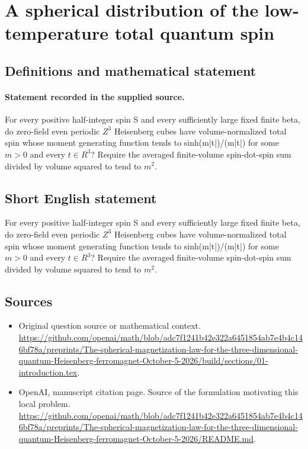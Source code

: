 \documentclass[11pt]{article}
\begin{document}
\section*{A spherical distribution of the low-temperature total quantum spin}\label{statement}
\subsection{Definitions and mathematical statement}
\paragraph{Statement recorded in the supplied source.}
For every positive half-integer spin S and every sufficiently large fixed finite beta, do zero-field even periodic $Z^3$ Heisenberg cubes have volume-normalized total spin whose moment generating function tends to sinh(m|t|)/(m|t|) for some $m>0$ and every $t\in R^3$? Require the averaged finite-volume spin-dot-spin sum divided by volume squared to tend to $m^2$.
\subsection{Short English statement}
For every positive half-integer spin S and every sufficiently large fixed finite beta, do zero-field even periodic $Z^3$ Heisenberg cubes have volume-normalized total spin whose moment generating function tends to sinh(m|t|)/(m|t|) for some $m>0$ and every $t\in R^3$? Require the averaged finite-volume spin-dot-spin sum divided by volume squared to tend to $m^2$.
\subsection{Sources}
\begin{itemize}
\item[S1] Original question source or mathematical context.
\url{https://github.com/openai/math/blob/adc7f1241b42e322a6451854ab7e4b4c146bf78a/preprints/The-spherical-magnetization-law-for-the-three-dimensional-quantum-Heisenberg-ferromagnet-October-5-2026/build/sections/01-introduction.tex}.
\item[S2] OpenAI, manuscript citation page. Source of the formulation motivating this local problem.
\url{https://github.com/openai/math/blob/adc7f1241b42e322a6451854ab7e4b4c146bf78a/preprints/The-spherical-magnetization-law-for-the-three-dimensional-quantum-Heisenberg-ferromagnet-October-5-2026/README.md}.
\end{itemize}
\end{document}
